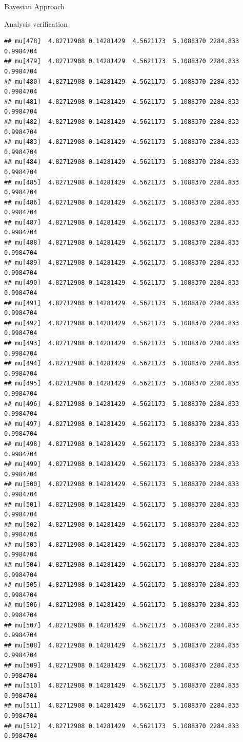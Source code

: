 \documentclass[
  ignorenonframetext,
]{beamer}
\begin{document}
\begin{frame}[fragile]{Bayesian Approach}
\begin{block}{Analysis verification}
\begin{verbatim}
## mu[478]  4.82712908 0.14281429  4.5621173  5.1088370 2284.833 0.9984704
## mu[479]  4.82712908 0.14281429  4.5621173  5.1088370 2284.833 0.9984704
## mu[480]  4.82712908 0.14281429  4.5621173  5.1088370 2284.833 0.9984704
## mu[481]  4.82712908 0.14281429  4.5621173  5.1088370 2284.833 0.9984704
## mu[482]  4.82712908 0.14281429  4.5621173  5.1088370 2284.833 0.9984704
## mu[483]  4.82712908 0.14281429  4.5621173  5.1088370 2284.833 0.9984704
## mu[484]  4.82712908 0.14281429  4.5621173  5.1088370 2284.833 0.9984704
## mu[485]  4.82712908 0.14281429  4.5621173  5.1088370 2284.833 0.9984704
## mu[486]  4.82712908 0.14281429  4.5621173  5.1088370 2284.833 0.9984704
## mu[487]  4.82712908 0.14281429  4.5621173  5.1088370 2284.833 0.9984704
## mu[488]  4.82712908 0.14281429  4.5621173  5.1088370 2284.833 0.9984704
## mu[489]  4.82712908 0.14281429  4.5621173  5.1088370 2284.833 0.9984704
## mu[490]  4.82712908 0.14281429  4.5621173  5.1088370 2284.833 0.9984704
## mu[491]  4.82712908 0.14281429  4.5621173  5.1088370 2284.833 0.9984704
## mu[492]  4.82712908 0.14281429  4.5621173  5.1088370 2284.833 0.9984704
## mu[493]  4.82712908 0.14281429  4.5621173  5.1088370 2284.833 0.9984704
## mu[494]  4.82712908 0.14281429  4.5621173  5.1088370 2284.833 0.9984704
## mu[495]  4.82712908 0.14281429  4.5621173  5.1088370 2284.833 0.9984704
## mu[496]  4.82712908 0.14281429  4.5621173  5.1088370 2284.833 0.9984704
## mu[497]  4.82712908 0.14281429  4.5621173  5.1088370 2284.833 0.9984704
## mu[498]  4.82712908 0.14281429  4.5621173  5.1088370 2284.833 0.9984704
## mu[499]  4.82712908 0.14281429  4.5621173  5.1088370 2284.833 0.9984704
## mu[500]  4.82712908 0.14281429  4.5621173  5.1088370 2284.833 0.9984704
## mu[501]  4.82712908 0.14281429  4.5621173  5.1088370 2284.833 0.9984704
## mu[502]  4.82712908 0.14281429  4.5621173  5.1088370 2284.833 0.9984704
## mu[503]  4.82712908 0.14281429  4.5621173  5.1088370 2284.833 0.9984704
## mu[504]  4.82712908 0.14281429  4.5621173  5.1088370 2284.833 0.9984704
## mu[505]  4.82712908 0.14281429  4.5621173  5.1088370 2284.833 0.9984704
## mu[506]  4.82712908 0.14281429  4.5621173  5.1088370 2284.833 0.9984704
## mu[507]  4.82712908 0.14281429  4.5621173  5.1088370 2284.833 0.9984704
## mu[508]  4.82712908 0.14281429  4.5621173  5.1088370 2284.833 0.9984704
## mu[509]  4.82712908 0.14281429  4.5621173  5.1088370 2284.833 0.9984704
## mu[510]  4.82712908 0.14281429  4.5621173  5.1088370 2284.833 0.9984704
## mu[511]  4.82712908 0.14281429  4.5621173  5.1088370 2284.833 0.9984704
## mu[512]  4.82712908 0.14281429  4.5621173  5.1088370 2284.833 0.9984704

\end{verbatim}
\end{block}
\end{frame}
\end{document}
